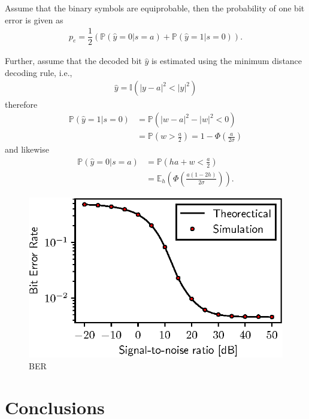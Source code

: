 \documentclass[conference, 10pt]{IEEEtran}
\begin{document}
Assume that the binary symbols are equiprobable, then the probability of one bit error
is given as
\begin{align}
    p_{e} = \dfrac{1}{2}\left(\mathbb{P}\left(\hat{y} = 0 | s = a\right)
                            + \mathbb{P}\left(\hat{y} = 1 | s = 0\right)\right).
\end{align}

Further, assume that the decoded bit $\hat{y}$ is estimated using the minimum distance decoding
rule, i.e.,
\begin{align}
    \hat{y} = \mathbb{I}(|y - a|^2 < |y|^2)
\end{align}
therefore
\begin{align}
    \mathbb{P}\left(\hat{y} = 1 | s = 0\right) & = \mathbb{P}\left(|w - a|^2 - |w|^2 < 0\right)\nonumber\\
    & = \mathbb{P}\left(w > \frac{a}{2}\right) = 1 - \Phi\left(\frac{a}{2\sigma}\right)
\end{align}
and likewise
\begin{align}
    \mathbb{P}\left(\hat{y} = 0 | s = a\right) & = \mathbb{P}\left(ha + w < \frac{a}{2}\right) \nonumber\\
    & = \mathbb{E}_h\left(\Phi\left(\frac{a(1 - 2h)}{2\sigma}\right)\right).
\end{align}

\begin{figure}[!htb]
    \centering
    \includegraphics{figures/ber.eps}
    \caption{BER}
    \label{fig:ber}
\end{figure}

\section{Conclusions}



\end{document}
